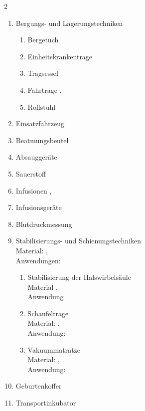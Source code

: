 \begin{WidePar}
\begin{multicols}{2}
\begin{enumerate}
    Medizinproduktegesetz -- Information \dotfill {}
    \item    Bergungs- und Lagerungstechniken
    \begin{enumerate}
      \item      Bergetuch \dotfill  {}
      \item      Einheitskrankentrage \dotfill {}
      \item      Tragsessel \dotfill {}
      \item      Fahrtrage \dotfill {},
      \item      Rollstuhl \dotfill {} %
    \end{enumerate}
    \item    Einsatzfahrzeug \dotfill {}
    \item    Beatmungsbeutel \dotfill {}
    \item    Absauggeräte \dotfill {}
    \item    Sauerstoff \dotfill {}
    \item    Infusionen  \dotfill {}, 
    \item    Infusionsgeräte \dotfill {}
    \item    Blutdruckmessung \dotfill {}
    \item    Stabilisierungs- und Schienungstechniken\\
    Material:  \dotfill {}, \\
    Anwendungen:  \dotfill {}
    \begin{enumerate}
      \item      Stabilisierung der Halswirbelsäule
      \\
      Material  \dotfill {}, \\
      Anwendung  \dotfill {}
      \item      Schaufeltrage
      \\
      Material:  \dotfill {},
      \\Anwendung:  \dotfill {}
      \item      Vakuummatratze
      \\
      Material:  \dotfill {},
      \\Anwendung: \dotfill
    \end{enumerate}
    \item    Geburtenkoffer \dotfill {}
    \item    Transportinkubator \dotfill {}
  \end{enumerate}
  


\end{multicols}
\end{WidePar}

